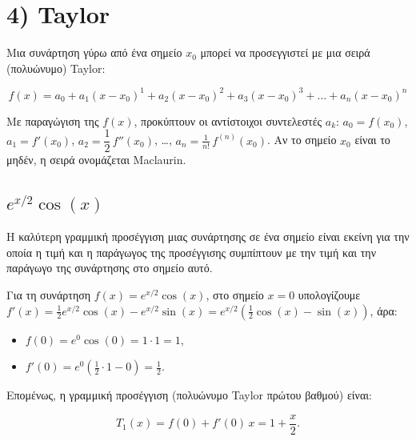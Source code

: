 \documentclass[
  a4paper,
  11pt,
]{article}
\begin{document}
\section{4) Taylor}\label{taylor}

Μια συνάρτηση γύρω από ένα σημείο \(x_0\) μπορεί να προσεγγιστεί με μια
σειρά (πολυώνυμο) Taylor:

\[
f(x) = a_0 + a_1(x - x_0)^1 + a_2(x - x_0)^2 + a_3(x - x_0)^3 + \dots + a_n(x - x_0)^n
\]

Με παραγώγιση της \(f(x)\), προκύπτουν οι αντίστοιχοι συντελεστές
\(a_k\): \(a_0 = f(x_0)\), \(a_1 = f'(x_0)\),
\(a_2 = \dfrac{1}{2}\,f''(x_0)\), \ldots,
\(a_n = \frac{1}{n!}\,f^{(n)}(x_0)\). Αν το σημείο \(x_0\) είναι το
μηδέν, η σειρά ονομάζεται Maclaurin.

\subsection{\texorpdfstring{\(e^{x/2}\cos(x)\)}{e\^{}\{x/2\}\textbackslash cos(x)}}\label{ex2cosx}

Η καλύτερη γραμμική προσέγγιση μιας συνάρτησης σε ένα σημείο είναι
εκείνη για την οποία η τιμή και η παράγωγος της προσέγγισης συμπίπτουν
με την τιμή και την παράγωγο της συνάρτησης στο σημείο αυτό.

Για τη συνάρτηση \(f(x) = e^{x/2} \cos(x)\), στο σημείο \(x = 0\)
υπολογίζουμε
\(f'(x) = \frac{1}{2} e^{x/2} \cos(x) - e^{x/2} \sin(x) = e^{x/2} \left( \frac{1}{2} \cos(x) - \sin(x) \right)\),
άρα:

\begin{itemize}
\item
  \(f(0) = e^{0} \cos(0) = 1 \cdot 1 = 1\),
\item
  \(f'(0) = e^{0} \left( \frac{1}{2} \cdot 1 - 0 \right) = \frac{1}{2}\).
\end{itemize}

Επομένως, η γραμμική προσέγγιση (πολυώνυμο Taylor πρώτου βαθμού) είναι:

\[
\boxed{T_1(x) = f(0) + f'(0) \, x = 1 + \frac{x}{2}}.
\]
\end{document}
